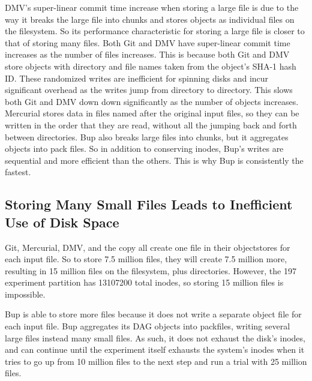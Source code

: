 DMV's super-linear commit time increase when storing a large file is due to the way it breaks the large file into chunks and stores objects as individual files on the filesystem.
So its performance characteristic for storing a large file is closer to that of storing many files.
Both Git and DMV have super-linear commit time increases as the number of files increases.
This is because both Git and DMV store objects with directory and file names taken from the object's SHA-1 hash ID.
These randomized writes are inefficient for spinning disks and incur significant overhead as the writes jump from directory to directory.
This slows both Git and DMV down down significantly as the number of objects increases.
Mercurial stores data in files named after the original input files, so they can be written in the order that they are read, without all the jumping back and forth between directories.
Bup also breaks large files into chunks, but it aggregates objects into pack files.
So in addition to conserving inodes, Bup's writes are sequential and more efficient than the others.
This is why Bup is consistently the fastest.


\subsection{Storing Many Small Files Leads to Inefficient Use of Disk Space}

Git, Mercurial, DMV, and the copy all create one file in their \glspl{objectstore} for each input file.
So to store \num{7.5} million files, they will create \num{7.5} million more, resulting in \num{15} million files on the filesystem, plus directories.
However, the \SI{197}{\gib} experiment partition has \num{13107200} total \glspl{inode}, so storing \num{15} million files is impossible.

Bup is able to store more files because it does not write a separate object file for each input file.
Bup aggregates its DAG objects into \glspl{packfile}, writing several large files instead many small files.
As such, it does not exhaust the disk's \glspl{inode}, and can continue until the experiment itself exhausts the system's \glspl{inode} when it tries to go up from \num{10} million files to the next step and run a trial with \num{25} million files.


%
